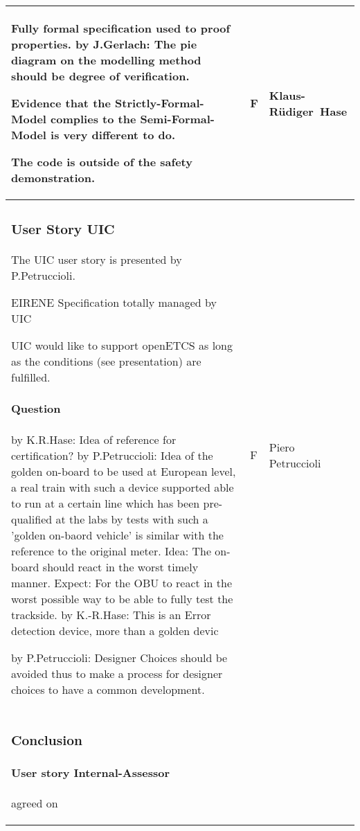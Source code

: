 \documentclass[a4paper]{article}
\newcommand{\Q}[2]{\paragraph{Question} by {#1}: #2}
\newcommand{\A}[2]{\newline{\textbf{Answer}} by {#1}: #2}
\newcommand{\C}[2]{\newline{\textbf{Comment}} by {#1}: #2}
\begin{document}
\begin{longtable}{|p{}|p{}|p{}|}
Fully formal specification used to proof properties. \newline
\newline
\C{J.Gerlach} The pie diagram on the modelling method should be degree of verification. \newline

Evidence that the Strictly-Formal-Model complies to the Semi-Formal-Model is very different to do. \newline

The code is outside of the safety demonstration.

& F
& Klaus-R\"{u}diger\ Hase
\\\hline
\setcounter{subsubsection}{3}
\subsubsection {User Story UIC} %
The UIC user story is presented by P.Petruccioli.

EIRENE Specification totally managed by UIC

UIC would like to support openETCS as long as the conditions (see presentation) are fulfilled.

\Q{K.R.Hase}{Idea of reference for certification?}
\A{P.Petruccioli}{Idea of the golden on-board to be used at European level, a real train with such a device supported able to run at a certain line which has been pre-qualified at the labs by tests with such a 'golden on-baord vehicle' is similar with the reference to the original meter. Idea: The on-board should react in the worst timely manner. 
Expect: For the OBU to react in the worst possible way to be able to fully test the trackside.}
\A{K.-R.Hase}{This is an Error detection device, more than a golden devic}

\C{P.Petruccioli}{Designer Choices should be avoided thus to make a process for designer choices to have a common development.}

& F
& Piero Petruccioli 
\\\hline
\setcounter{subsubsection}{5}
\subsubsection {Conclusion} %

\paragraph{User story Internal-Assessor} agreed on


\end{longtable}
\end{document}
